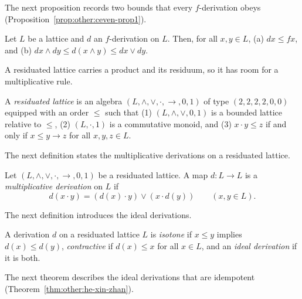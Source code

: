 The next proposition records two bounds that every $f$-derivation obeys (Proposition~\ref{prop:other:ceven-prop1}).

\begin{proposition}\label{prop:other:ceven-prop1}
Let $L$ be a lattice and $d$ an $f$-derivation on $L$. Then, for all
$x, y \in L$, \textup{(a)} $dx \le fx$, and \textup{(b)}
$dx \wedge dy \le d(x \wedge y) \le dx \vee dy$.
\end{proposition}

A residuated lattice carries a product and its residuum, so it has room
for a multiplicative rule.

\begin{definition}\label{def:other:residuated-lattice}
A \emph{residuated lattice} is an algebra
$(L, \wedge, \vee, \cdot, \to, 0, 1)$ of type $(2, 2, 2, 2, 0, 0)$
equipped with an order $\le$ such that \textup{(1)}
$(L, \wedge, \vee, 0, 1)$ is a bounded lattice relative to $\le$,
\textup{(2)} $(L, \cdot, 1)$ is a commutative monoid, and \textup{(3)}
$x \cdot y \le z$ if and only if $x \le y \to z$ for all $x, y, z \in L$.
\end{definition}

The next definition states the multiplicative derivations on a residuated lattice.

\begin{definition}\label{def:other:multiplicative-derivation}
Let $(L, \wedge, \vee, \cdot, \to, 0, 1)$ be a residuated lattice. A map
$d \colon L \to L$ is a \emph{multiplicative derivation} on $L$ if
\[
d(x \cdot y) = (d(x) \cdot y) \vee (x \cdot d(y))
\qquad (x, y \in L).
\]
\end{definition}

The next definition introduces the ideal derivations.

\begin{definition}\label{def:other:ideal-derivation}
A derivation $d$ on a residuated lattice $L$ is \emph{isotone} if
$x \le y$ implies $d(x) \le d(y)$, \emph{contractive} if $d(x) \le x$ for
all $x \in L$, and an \emph{ideal derivation} if it is both.
\end{definition}

The next theorem describes the ideal derivations that are idempotent (Theorem~\ref{thm:other:he-xin-zhan}).


